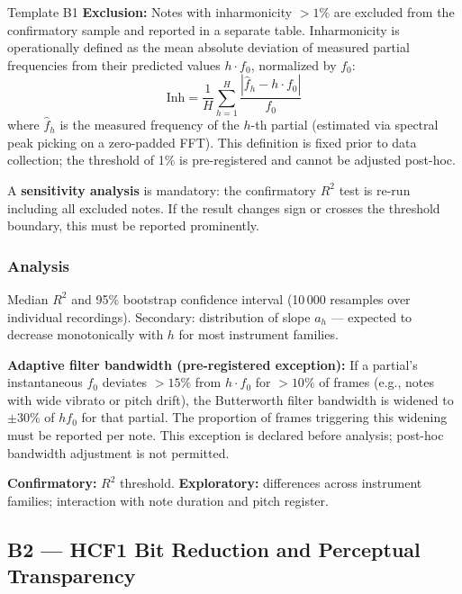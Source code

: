 \documentclass[11pt, a4paper]{article}
\begin{document}
\begin{predbox}{Template B1}
\textbf{Exclusion:} Notes with inharmonicity $> 1\%$ are excluded from the
confirmatory sample and reported in a separate table.  Inharmonicity is
operationally defined as the mean absolute deviation of measured partial
frequencies from their predicted values $h \cdot f_0$, normalized by $f_0$:
\[
  \mathrm{Inh} = \frac{1}{H} \sum_{h=1}^{H}
    \frac{|\hat{f}_h - h \cdot f_0|}{f_0}
\]
where $\hat{f}_h$ is the measured frequency of the $h$-th partial (estimated
via spectral peak picking on a zero-padded FFT).  This definition is fixed
prior to data collection; the threshold of 1\% is pre-registered and cannot
be adjusted post-hoc.

A \textbf{sensitivity analysis} is mandatory: the confirmatory $R^2$ test is
re-run including all excluded notes.  If the result changes sign or crosses the
threshold boundary, this must be reported prominently.

\subsubsection{Analysis}

Median $R^2$ and 95\% bootstrap confidence interval (10\,000 resamples over
individual recordings).  Secondary: distribution of slope $a_h$ — expected to
decrease monotonically with $h$ for most instrument families.

\textbf{Adaptive filter bandwidth (pre-registered exception):}
If a partial's instantaneous $f_0$ deviates $> 15\%$ from $h \cdot f_0$ for
$> 10\%$ of frames (e.g., notes with wide vibrato or pitch drift), the
Butterworth filter bandwidth is widened to $\pm 30\%$ of $h f_0$ for that
partial.  The proportion of frames triggering this widening must be reported
per note.  This exception is declared before analysis; post-hoc bandwidth
adjustment is not permitted.

\textbf{Confirmatory:} $R^2$ threshold.
\textbf{Exploratory:} differences across instrument families; interaction with
note duration and pitch register.

\end{predbox}

\subsection{B2 — HCF1 Bit Reduction and Perceptual Transparency}
\end{document}
